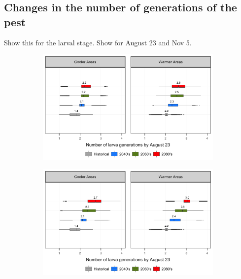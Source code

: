 \documentclass[12pt]{article}
\theoremstyle{plain}
\theoremstyle{definition}
\theoremstyle{definition}
\begin{document}
\pagebreak

\subsection{Changes in the number of generations of the pest}
Show this for the larval stage. Show for August 23 and Nov 5.

\begin{figure}[h!]
    \centering
    \begin{subfigure}[b]{0.45\textwidth}
        \includegraphics[width=\textwidth]{figures/Larva_Gen_Aug_rcp45}
    \end{subfigure}
    \begin{subfigure}[b]{0.45\textwidth}
        \includegraphics[width=\textwidth]{figures/Larva_Gen_Aug_rcp85}

\end{subfigure}
\end{figure}
\end{document}

